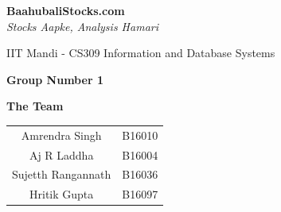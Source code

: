 \documentclass{report}
\date{\huge 29 May, 2018 }
\begin{document}
\begin{titlepage}
    \begin{center}
        \vspace*{1cm}
        
        \Huge
        \textbf{BaahubaliStocks.com}\\
        \LARGE\textit{Stocks Aapke, Analysis Hamari}
        
        \vspace{1cm}
        \LARGE
        IIT Mandi - CS309 Information and Database Systems
        
        \vspace{1cm}
		\textbf{Group Number 1}
		
		\vspace{1cm}     
        
        \vspace{1.5cm}
        
        \textbf{The Team}
        \vspace{0.5cm}
        \large 
        
        	\begin{center}
        	\fontsize{15}{15}\selectfont
			\begin{tabular}{ c c }
			
 			Amrendra Singh & B16010 \\ 
 			Aj R Laddha & B16004 \\  
 			Sujetth Rangannath & B16036\\
 			Hritik Gupta & B16097\\ 
			\end{tabular}
			\end{center}
        
    \end{center}
\end{titlepage}



\tableofcontents
\end{document}
